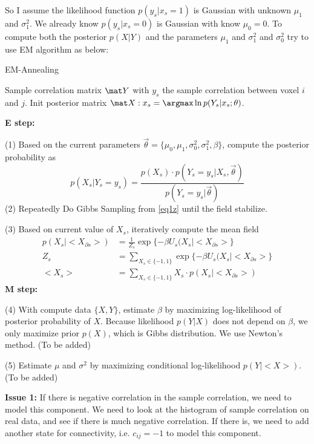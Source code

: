 \documentclass[12pt]{article}
\begin{document}
So I assume the likelihood function $p(y_s|x_s = 1)$ is Gaussian with unknown $\mu_1$ and $\sigma_1^2$. We already know $p(y_s|x_s=0)$ is Gaussian with know $\mu_0 = 0$. To compute both the posterior $p(X|Y)$ and the parameters $\mu_1$ and $\sigma_1^2$ and $\sigma_0^2$ try to use EM algorithm as below:
\begin{algorithm}                 
\caption{EM-Annealing}         
\label{alg1}                   
\begin{algorithmic}            
\REQUIRE Sample correlation matrix $\mat Y$ with $y_s$ the sample correlation between voxel $i$ and $j$.
\STATE Init posterior matrix $\mat X: x_s = \argmax \ln p(Y_s | x_s; \theta) $.

\STATE \textbf{E step: }

(1) Based on the current parameters $\vec \theta = \{\mu_0, \mu_1, \sigma_0^2, \sigma_1^2, \beta\}$, compute the posterior probability as
\begin{equation}
p(X_s | Y_s = y_s) = \frac{p(X_s)\cdot p(Y_s = y_s | X_s, \vec \theta)}{p(Y_s = y_s | \vec \theta)} \label{eq1z}
\end{equation}
(2) Repeatedly Do Gibbs Sampling from \eqref{eq1z} until the field stabilize.

(3) Based on current value of $X_s$, iteratively compute the mean field
\begin{align}
p(X_s | < X_{\partial s}>) &= \frac{1}{Z_s} \exp\{-\beta U_s(X_s | <X_{\partial s}>\}\\
Z_s &= \sum_{X_s\in \{-1, 1\}}^{}\exp\{-\beta U_s(X_s | <X_{\partial s}>\}\\
<X_s> &= \sum_{X_s\in \{-1, 1\}}^{} X_s \cdot p(X_s | <X_{\partial s}>)
\end{align}
\STATE \textbf{M step: }

(4) With compute data $\{X, Y\}$, estimate $\beta$ by maximizing log-likelihood of posterior probability of $X$. Because likelihood $p(Y | X)$ does not depend on $\beta$, we only maximize prior $p(X)$, which is Gibbs distribution. We use Newton's method. (To be added)

(5) Estimate $\mu$ and $\sigma^2$ by maximizing conditional log-likelihood $p(Y | <X>)$. (To be added)
\ENDWHILE
\end{algorithmic}
\end{algorithm}

\textbf{Issue 1: }If there is negative correlation in the sample correlation, we need to model this component. We need to look at the histogram of sample correlation on real data, and see if there is much negative correlation. If there is, we need to add another state for connectivity, i.e. $c_{ij} = -1$ to model this component.
\end{document}
